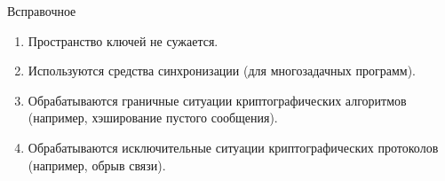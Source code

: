 \begin{appendix}{В}{справочное}
\begin{enumerate}
\item 
Пространство ключей не сужается.

\item 
Используются средства синхронизации (для многозадачных программ).

\item 
Обрабатываются граничные ситуации криптографических алгоритмов 
(например, хэширование пустого сообщения). 

\item 
Обрабатываются исключительные ситуации криптографических протоколов 
(например, обрыв связи). 
\end{enumerate}

\end{appendix}
